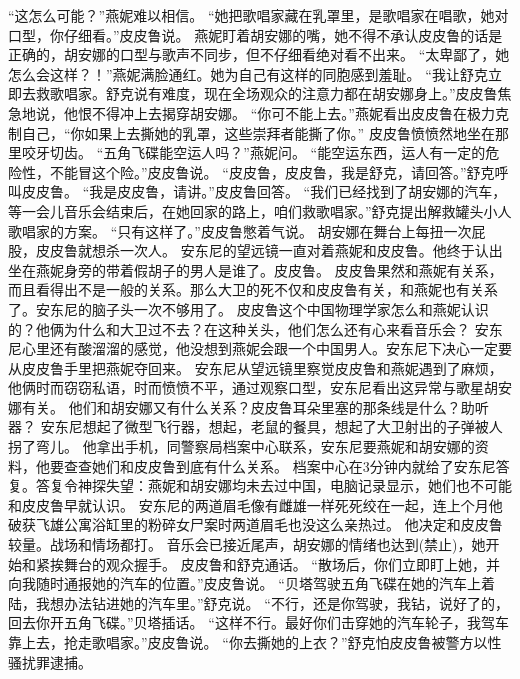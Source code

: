 \documentclass[a4paper,12pt,UTF8,twoside]{ctexbook}
\begin{document}
        “这怎么可能？”燕妮难以相信。 
        “她把歌唱家藏在乳罩里，是歌唱家在唱歌，她对口型，你仔细看。”皮皮鲁说。 
        燕妮盯着胡安娜的嘴，她不得不承认皮皮鲁的话是正确的，胡安娜的口型与歌声不同步，但不仔细看绝对看不出来。 
        “太卑鄙了，她怎么会这样？！”燕妮满脸通红。她为自己有这样的同胞感到羞耻。 
        “我让舒克立即去救歌唱家。舒克说有难度，现在全场观众的注意力都在胡安娜身上。”皮皮鲁焦急地说，他恨不得冲上去揭穿胡安娜。 
        “你可不能上去。”燕妮看出皮皮鲁在极力克制自己，“你如果上去撕她的乳罩，这些崇拜者能撕了你。” 
        皮皮鲁愤愤然地坐在那里咬牙切齿。 
        “五角飞碟能空运人吗？”燕妮问。 
        “能空运东西，运人有一定的危险性，不能冒这个险。”皮皮鲁说。 
        “皮皮鲁，皮皮鲁，我是舒克，请回答。”舒克呼叫皮皮鲁。 
        “我是皮皮鲁，请讲。”皮皮鲁回答。 
        “我们已经找到了胡安娜的汽车，等一会儿音乐会结束后，在她回家的路上，咱们救歌唱家。”舒克提出解救罐头小人歌唱家的方案。 
        “只有这样了。”皮皮鲁憋着气说。 
        胡安娜在舞台上每扭一次屁股，皮皮鲁就想杀一次人。 
        安东尼的望远镜一直对着燕妮和皮皮鲁。他终于认出坐在燕妮身旁的带着假胡子的男人是谁了。皮皮鲁。 
        皮皮鲁果然和燕妮有关系，而且看得出不是一般的关系。那么大卫的死不仅和皮皮鲁有关，和燕妮也有关系了。安东尼的脑子头一次不够用了。 
        皮皮鲁这个中国物理学家怎么和燕妮认识的？他俩为什么和大卫过不去？在这种关头，他们怎么还有心来看音乐会？ 
        安东尼心里还有酸溜溜的感觉，他没想到燕妮会跟一个中国男人。安东尼下决心一定要从皮皮鲁手里把燕妮夺回来。 
        安东尼从望远镜里察觉皮皮鲁和燕妮遇到了麻烦，他俩时而窃窃私语，时而愤愤不平，通过观察口型，安东尼看出这异常与歌星胡安娜有关。 
        他们和胡安娜又有什么关系？皮皮鲁耳朵里塞的那条线是什么？助听器？ 
        安东尼想起了微型飞行器，想起，老鼠的餐具，想起了大卫射出的子弹被人拐了弯儿。 
        他拿出手机，同警察局档案中心联系，安东尼要燕妮和胡安娜的资料，他要查查她们和皮皮鲁到底有什么关系。 
        档案中心在3分钟内就给了安东尼答复。答复令神探失望：燕妮和胡安娜均未去过中国，电脑记录显示，她们也不可能和皮皮鲁早就认识。 
        安东尼的两道眉毛像有雌雄一样死死绞在一起，连上个月他破获飞雄公寓浴缸里的粉碎女尸案时两道眉毛也没这么亲热过。 
        他决定和皮皮鲁较量。战场和情场都打。 
        音乐会已接近尾声，胡安娜的情绪也达到(禁止)，她开始和紧挨舞台的观众握手。 
        皮皮鲁和舒克通话。 
        “散场后，你们立即盯上她，并向我随时通报她的汽车的位置。”皮皮鲁说。 
        “贝塔驾驶五角飞碟在她的汽车上着陆，我想办法钻进她的汽车里。”舒克说。 
        “不行，还是你驾驶，我钻，说好了的，回去你开五角飞碟。”贝塔插话。 
        “这样不行。最好你们击穿她的汽车轮子，我驾车靠上去，抢走歌唱家。”皮皮鲁说。 
        “你去撕她的上衣？”舒克怕皮皮鲁被警方以性骚扰罪逮捕。 
\end{document}

